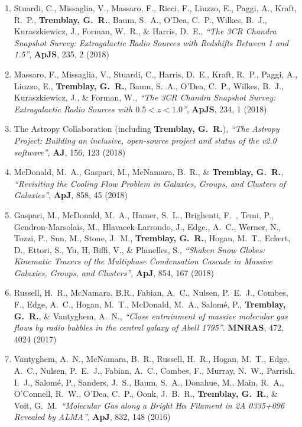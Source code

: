 \documentclass[11pt]{article}
\begin{document}
\begin{enumerate}[resume]
\item Stuardi, C., Missaglia, V., Massaro, F., Ricci, F., Liuzzo, E.,
Paggi, A., Kraft, R.~P., \textbf{Tremblay, G.~R.}, Baum, S.~A.,
O'Dea, C.~P., Wilkes, B.~J., Kuraszkiewicz, J., Forman, W.~R., \& Harris, D.~E.,
\textit{``The 3CR Chandra Snapshot Survey: Extragalactic Radio Sources
with Redshifts Between 1 and 1.5''}, \textbf{ApJS}, 235, 2 (2018)


\item Massaro, F., Missaglia, V., Stuardi, C., Harris, D.~E.,
Kraft, R.~P., Paggi, A., Liuzzo, E., \textbf{Tremblay, G.~R.},
Baum, S.~A., O'Dea, C.~P., Wilkes, B.~J., Kuraszkiewicz, J., \& Forman, W., \textit{``The 3CR Chandra Snapshot Survey:
Extragalactic Radio Sources with $0.5 < z < 1.0$''}, \textbf{ApJS}, 234, 1 (2018)


\item The Astropy Collaboration (including \textbf{Tremblay, G.~R.}), \textit{``The Astropy Project: Building an inclusive,
open-source project and status of the v2.0 software''}, \textbf{AJ}, 156, 123 (2018)


\item McDonald, M.~A., Gaspari, M., McNamara, B.~R., \& \textbf{Tremblay, G.~R.}, \textit{``Revisiting the Cooling Flow Problem in Galaxies, Groups, and Clusters of Galaxies''}, \textbf{ApJ}, 858, 45 (2018)


\item Gaspari, M., McDonald, M.~A.,
Hamer, S.~L., Brighenti, F.~, Temi, P., Gendron-Marsolais, M., Hlavacek-Larrondo, J., Edge., A.~C.,
Werner, N., Tozzi, P., Sun, M.,
Stone, J.~M., \textbf{Tremblay, G.~R.}, Hogan, M.~T., Eckert, D.,
Ettori, S., Yu, H, Biffi, V.,
\& Planelles, S., \textit{``Shaken Snow Globes: Kinematic Tracers of the Multiphase Condensation
 Cascade in Massive Galaxies, Groups, and Clusters''}, \textbf{ApJ}, 854, 167 (2018)

\item Russell, H.~R., McNamara, B.R., Fabian, A.~C., Nulsen, P.~E.~J., Combes, F., Edge, A.~C., Hogan, M.~T., McDonald, M.~A., Salom\'{e}, P.,
\textbf{Tremblay, G.~R.}, \& Vantyghem, A.~N., \textit{``Close entrainment of massive molecular gas flows by radio bubbles in the central galaxy of Abell 1795''}. \textbf{MNRAS}, 472, 4024 (2017)


\item Vantyghem, A.~N., McNamara, B.~R.,
Russell, H.~R., Hogan, M.~T., Edge, A.~C.,
Nulsen, P.~E.~J., Fabian, A.~C., Combes, F.,
Murray, N.~W., Parrish, I.~J., Salom\'{e}, P.,
Sanders, J.~S., Baum, S.~A., Donahue, M.,
Main, R.~A., O'Connell, R.~W., O'Dea, C.~P.,
Oonk, J.~B.~R., \textbf{Tremblay, G.~R.}, \& Voit, G.~M.\ \textit{``Molecular Gas along a Bright H$\alpha$ Filament in 2A 0335+096 Revealed by ALMA''}, \textbf{ApJ}, 832, 148 (2016)


\end{enumerate}
\end{document}
